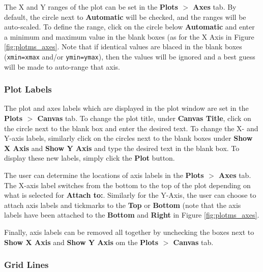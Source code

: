 The X and Y ranges of the plot can be set in the {\bf Plots $>$ Axes} tab. By default, the circle next to {\bf Automatic} will be checked, and the ranges will be auto-scaled. To define the range, click on the circle below {\bf Automatic} and enter a minimum and maximum value in the blank boxes (as for the X Axis in Figure \ref{fig:plotms_axes}. Note that if identical values are blaced in the blank boxes ({\tt xmin=xmax} and/or {\tt ymin=ymax}), then the values will be ignored and a best guess will be made to auto-range that axis.


\subsubsection{Plot Labels}
\label{section:edit.plot.plotms.labels}

The plot and axes labels which are displayed in the plot window are
set in the {\bf Plots $>$ Canvas} tab. To change the plot title, under
{\bf Canvas Title}, click on the circle next to the blank box and
enter the desired text. 
To change the X- and Y-axis labels, similarly click on the circles next to the blank boxes under {\bf Show X Axis} and {\bf Show Y Axis} and type the desired text in the blank box. To display these new labels, simply click the {\bf Plot} button.

The user can determine the locations of axis labels in the {\bf Plots $>$ Axes} tab. The X-axis label switches from the bottom to the top of the plot depending on what is selected for {\bf Attach to:}. Similarly for the Y-Axis, the user can choose to attach axis labels and tickmarks to the {\bf Top} or {\bf Bottom} (note that the axis labels have been attached to the {\bf Bottom} and {\bf Right} in Figure \ref{fig:plotms_axes}.

Finally, axis labels can be removed all together by unchecking the boxes next to {\bf Show X Axis} and {\bf Show Y Axis} om the {\bf Plots $>$ Canvas} tab.


\subsubsection{Grid Lines}
\label{section:edit.plot.plotms.grid}

